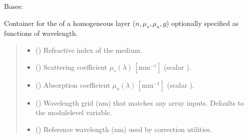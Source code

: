 \documentclass[letterpaper,10pt,english]{sphinxmanual}
\begin{document}
\begin{fulllineitems}
\label{\detokenize{generated/photon_canon.optics:photon_canon.optics.Medium}}
\pysigstartsignatures
\pysiglinewithargsret
{}
{}
{}
\pysigstopsignatures
\sphinxAtStartPar
Bases: 

\sphinxAtStartPar
Container for the  of a homogeneous layer (\(n, \mu_s, \mu_a, g\)) optionally specified as
functions of wavelength.
\begin{quote}\begin{description}
\begin{itemize}
\item {} 
\sphinxAtStartPar
{} () \textendash{} Refractive index of the medium.

\item {} 
\sphinxAtStartPar
{} (\sphinxstyleliteralemphasis{\sphinxupquote{ | }}) \textendash{} Scattering coefficient
\(\mu_s(\lambda)\,[\mathrm{mm}^{-1}]\)
(scalar  ).

\item {} 
\sphinxAtStartPar
{} (\sphinxstyleliteralemphasis{\sphinxupquote{ | }}) \textendash{} Absorption coefficient
\(\mu_a(\lambda)\,[\mathrm{mm}^{-1}]\)
(scalar  ).

\item {} 
\sphinxAtStartPar
{} () \textendash{} Wavelength grid (nm) that matches any array
inputs.  Defaults to the module\sphinxhyphen{}level
 variable.

\item {} 
\sphinxAtStartPar
{} () \textendash{} Reference wavelength (nm) used by
correction utilities.


\end{itemize}
\end{description}
\end{quote}
\end{fulllineitems}
\end{document}
